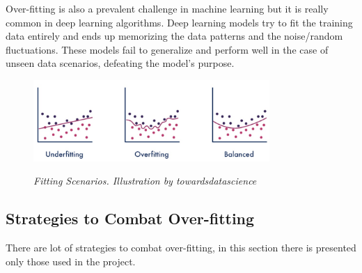 Over-fitting is also a prevalent challenge in machine learning but it is really common in deep learning algorithms. Deep learning models try to fit the training data entirely and ends up memorizing the data patterns and the noise/random fluctuations. These models fail to generalize and perform well in the case of unseen data scenarios, defeating the model's purpose. \\

\begin{figure}[H]
\centering
\includegraphics[width=0.8\textwidth]{imatges/preliminaries/over-under-base.jpg}
\caption[Fitting Scenarios]{\textit{Fitting Scenarios. Illustration by towardsdatascience}}
{\label{fig:underfitting-overfitting-goodfitting}}
\end{figure}

\subsection{Strategies to Combat Over-fitting}

There are lot of strategies to combat over-fitting, in this section there is presented only those used in the project. \\

